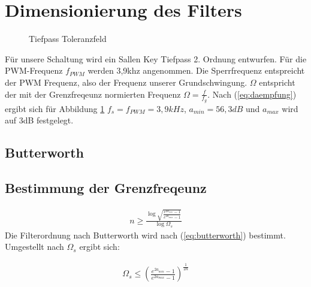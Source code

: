 \documentclass[11pt,twoside,openright]{mpreport}
\begin{document}
\section{Dimensionierung des Filters}
\begin{figure}[H]
\centering
{}
\caption{Tiefpass Toleranzfeld}%
\label{fig:analog}
\end{figure}
Für unsere Schaltung wird ein Sallen Key Tiefpass 2. Ordnung entwurfen. Für die PWM-Frequenz $f_{PWM}$ werden 3,9khz angenommen.
Die Sperrfrequenz entspreicht der PWM Frequenz, also der Frequenz unserer Grundschwingung. $\Omega$ entspricht der mit der Grenzfreqeunz 
normierten Frequenz $\Omega=\frac{f}{f_g}$. Nach (\ref{eq:daempfung}) ergibt sich für Abbildung \ref{fig:analog}
$f_s=f_{PWM}=3,9 kHz$, $a_{min}=56,3 dB$ und $a_{max}$ wird auf 3dB festgelegt.



\subsection{Butterworth}
\subsection{Bestimmung der Grenzfreqeunz}
\begin{align}
n \ge \frac{\log{\sqrt{\frac{e^{2a_{min}}-1}{e^{2a_{max}}-1}}}}{\log{\Omega_s}}
\label{eq:butterworth}
\end{align}
Die Filterordnung nach Butterworth wird nach (\ref{eq:butterworth}) bestimmt. Umgestellt nach $\Omega_s$ ergibt sich:

\begin{align}
\Omega_s \le  \left(\frac{e^{2a_{min}}-1}{e^{2a_{max}}-1}\right)^{\frac{1}{2n}}
\end{align}
\end{document}
